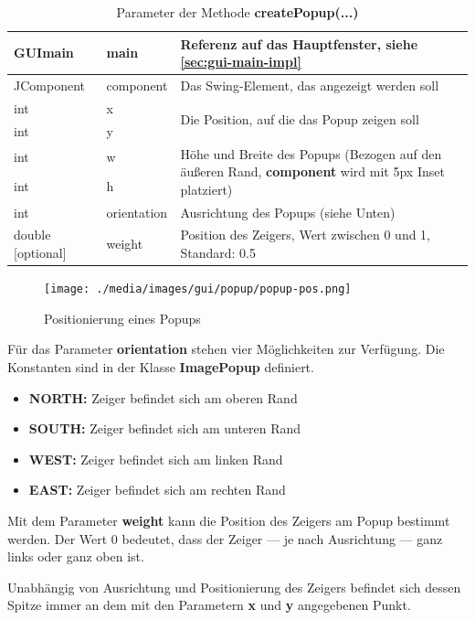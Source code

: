 \begin{table}[h!]
\begin{tabular}{|ll|l|}
\hline 
GUImain & main  & Referenz auf das Hauptfenster, siehe \ref{sec:gui-main-impl} \\
\hline
JComponent & component & Das Swing-Element, das angezeigt werden soll \\
\hline
int & x & \multirow{2}{8cm}{Die Position, auf die das Popup zeigen soll} \\
int & y & \\
\hline 
int & w & \multirow{2}{8cm}{Höhe und Breite des Popups (Bezogen auf den äußeren Rand, \textbf{component} wird mit 5px Inset platziert)} \\
int & h & \\
\hline
int & orientation & Ausrichtung des Popups (siehe Unten) \\
\hline
double [optional] & weight & Position des Zeigers, Wert zwischen 0 und 1, Standard: 0.5\\
\hline
\end{tabular}
\caption{Parameter der Methode \textbf{createPopup(...)}}
\end{table}

\begin{figure}[h!]
\centering
\texttt{[image: ./media/images/gui/popup/popup-pos.png]}
\caption{Positionierung eines Popups}
\end{figure}

Für das Parameter \textbf{orientation} stehen vier Möglichkeiten zur Verfügung. Die Konstanten sind in der Klasse \textbf{ImagePopup} definiert.
\begin{itemize}
\item \textbf{NORTH:} Zeiger befindet sich am oberen Rand
\item \textbf{SOUTH:} Zeiger befindet sich am unteren Rand
\item \textbf{WEST:} Zeiger befindet sich am linken Rand
\item \textbf{EAST:} Zeiger befindet sich am rechten Rand
\end{itemize}

Mit dem Parameter \textbf{weight} kann die Position des Zeigers am Popup bestimmt werden. Der Wert 0 bedeutet, dass der Zeiger --- je nach Ausrichtung --- ganz links oder ganz oben ist.

Unabhängig von Ausrichtung und Positionierung des Zeigers befindet sich dessen Spitze immer an dem mit den Parametern \textbf{x} und \textbf{y} angegebenen Punkt.

